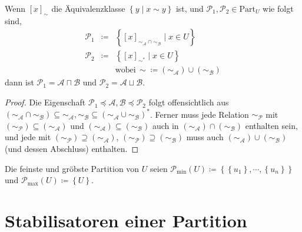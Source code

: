 \begin{prop}
\label{prop:part-eq}Wenn $\left[x\right]_{\sim}$ die Äquivalenzklasse
$\left\{ y\mid x\sim y\right\} $ ist, und $\mathcal{P}_{1},\mathcal{P}_{2}\in\mathrm{Part}_{U}$
wie folgt sind, 
\begin{eqnarray*}
\mathcal{P}_{1} & \coloneqq & \left\{ \left[x\right]_{\sim_{\mathcal{A}}\cap\sim_{\mathcal{B}}}\mid x\in U\right\} \\
\mathcal{P}_{2} & \coloneqq & \left\{ \left[x\right]_{\sim^{*}}\mid x\in U\right\} \\
 &  & \mathrm{wobei}\,\sim\coloneqq\left(\sim_{\mathcal{A}}\right)\cup\left(\sim_{\mathcal{B}}\right)
\end{eqnarray*}
dann ist $\mathcal{P}_{1}=\mathcal{A}\sqcap\mathcal{B}$ und $\mathcal{P}_{2}=\mathcal{A}\sqcup\mathcal{B}$.
\end{prop}
\begin{proof}
Die Eigenschaft $\mathcal{P}_{1}\preceq\mathcal{A},\mathcal{B}\preceq\mathcal{P}_{2}$
folgt offensichtlich aus $\left(\sim_{\mathcal{A}}\cap\sim_{\mathcal{B}}\right)\subseteq\sim_{\mathcal{A}},\sim_{\mathcal{B}}\subseteq\left(\sim_{\mathcal{A}}\cup\sim_{\mathcal{B}}\right)^{*}$.
Ferner muss jede Relation $\sim_{\mathcal{P}}$ mit $\left(\sim_{\mathcal{P}}\right)\subseteq\left(\sim_{\mathcal{A}}\right)$
und $\left(\sim_{\mathcal{A}}\right)\subseteq\left(\sim_{\mathcal{B}}\right)$
auch in $\left(\sim_{\mathcal{A}}\right)\cap\left(\sim_{\mathcal{B}}\right)$
enthalten sein, und jede mit $\left(\sim_{\mathcal{P}}\right)\supseteq\left(\sim_{\mathcal{A}}\right)$,
$\left(\sim_{\mathcal{P}}\right)\supseteq\left(\sim_{\mathcal{B}}\right)$
muss auch $\left(\sim_{\mathcal{A}}\right)\cup\left(\sim_{\mathcal{B}}\right)$
(und dessen Abschluss) enthalten.
\end{proof}
\begin{defn}
Die feinste und gröbste Partition von $U$ seien $\mathcal{P}_{\min}\left(U\right)\coloneqq\left\{ \left\{ u_{1}\right\} ,\cdots,\left\{ u_{n}\right\} \right\} $
und $\mathcal{P}_{\max}\left(U\right)\coloneqq\left\{ U\right\} $.
\end{defn}

\section{Stabilisatoren einer Partition}

